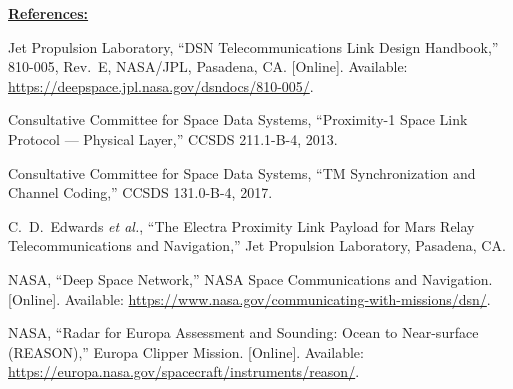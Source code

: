 \documentclass[11pt]{article}
\begin{document}
\bigskip

\noindent\underline{\textbf{References:}}

\begin{enumerate}[leftmargin=*, label={[\arabic*]}]
    \item Jet Propulsion Laboratory, ``DSN Telecommunications Link Design Handbook,'' 810-005,
    Rev.~E, NASA/JPL, Pasadena, CA. [Online]. Available:
    \url{https://deepspace.jpl.nasa.gov/dsndocs/810-005/}.
    \item Consultative Committee for Space Data Systems, ``Proximity-1 Space Link Protocol ---
    Physical Layer,'' CCSDS 211.1-B-4, 2013.
    \item Consultative Committee for Space Data Systems, ``TM Synchronization and Channel Coding,''
    CCSDS 131.0-B-4, 2017.
    \item C.~D.~Edwards \textit{et al.}, ``The Electra Proximity Link Payload for Mars Relay
    Telecommunications and Navigation,'' Jet Propulsion Laboratory, Pasadena, CA.
    \item NASA, ``Deep Space Network,'' NASA Space Communications and Navigation. [Online].
    Available: \url{https://www.nasa.gov/communicating-with-missions/dsn/}.
    \item NASA, ``Radar for Europa Assessment and Sounding: Ocean to Near-surface (REASON),''
    Europa Clipper Mission. [Online]. Available:
    \url{https://europa.nasa.gov/spacecraft/instruments/reason/}.
\end{enumerate}

\bigskip

\end{document}
